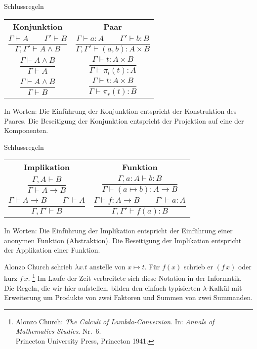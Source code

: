 \documentclass[8pt]{beamer}
\newcommand{\strong}[1]{\textsf{\textbf{#1}}}
\newcommand{\parspace}{\vspace{0.8em}}
\newcommand{\cond}{\rightarrow}
\begin{document}
\begin{frame}
\begin{block}{Schlussregeln}
\begin{center}
\begin{tabular}{c@{\qquad\qquad}c}
\strong{Konjunktion}
& \strong{Paar}\\[10pt]
$\dfrac{\Gamma\vdash A\qquad\Gamma'\vdash B}{\Gamma,\Gamma'\vdash A\land B}$
&
$\dfrac{\Gamma\vdash a\colon A\qquad\Gamma'\vdash b\colon B}{\Gamma,\Gamma'\vdash (a,b)\colon A\times B}$\\[18pt]
$\dfrac{\Gamma\vdash A\land B}{\Gamma\vdash A}$
& $\dfrac{\Gamma\vdash t\colon A\times B}{\Gamma\vdash \pi_l(t)\colon A}$\\[18pt]
$\dfrac{\Gamma\vdash A\land B}{\Gamma\vdash B}$
& $\dfrac{\Gamma\vdash t\colon A\times B}{\Gamma\vdash \pi_r(t)\colon B}$
\end{tabular}
\end{center}
\end{block}\pause

\parspace
In Worten: Die Einführung der Konjunktion entspricht der Konstruktion
des Paares. Die Beseitigung der Konjunktion entspricht der Projektion
auf eine der Komponenten.
\end{frame}

\begin{frame}
\begin{block}{Schlussregeln}
\begin{center}
\begin{tabular}{c@{\qquad\qquad}c}
\strong{Implikation}
& \strong{Funktion}\\[10pt]
$\dfrac{\Gamma, A\vdash B}{\Gamma\vdash A\cond B}$
&
$\dfrac{\Gamma, a\colon A\vdash b\colon B}{\Gamma\vdash (a\mapsto b)\colon A\to B}$\\[18pt]
$\dfrac{\Gamma\vdash A\cond B\qquad\Gamma'\vdash A}{\Gamma,\Gamma'\vdash B}$
& $\dfrac{\Gamma\vdash f\colon A\to B\qquad\Gamma'\vdash a\colon A}{\Gamma,\Gamma'\vdash f(a)\colon B}$
\end{tabular}
\end{center}
\end{block}\pause

\parspace
In Worten: Die Einführung der Implikation entspricht der Einführung
einer anonymen Funktion (Abstraktion). Die Beseitigung der Implikation
entspricht der Applikation einer Funktion.\pause

\parspace
\begin{small}
Alonzo Church schrieb $\lambda x.t$ anstelle von $x\mapsto t$.
Für $f(x)$ schrieb er $(f\,x)$ oder kurz $f\,x$.%
\footnote{Alonzo Church: \emph{The Calculi of Lambda-Conversion}.
In: \emph{Annals of Mathematics Studies}. Nr.~6.\\
Princeton University Press, Princeton 1941.}
Im Laufe der Zeit verbreitete sich diese Notation in der Informatik.
Die Regeln, die wir hier aufstellen, bilden den einfach
typisierten $\lambda$-Kalkül mit Erweiterung um Produkte von zwei
Faktoren und Summen von zwei Summanden.
\end{small}
\end{frame}
\end{document}
